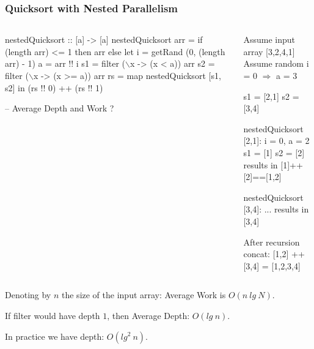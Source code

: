 \documentclass{beamer}
\newcommand{\emp}[1]{\textcolor{DikuRed}{ #1}}
\newcommand{\mymath}[1]{$ #1 $}
\begin{document}
\begin{frame}[fragile,t]
  \frametitle{Quicksort with Nested Parallelism}

\begin{columns}
\begin{colorcode}[fontsize=\scriptsize]
nestedQuicksort :: [a] -> [a]
nestedQuicksort arr = 
  if (length arr) <= 1 then arr else 
  let i = getRand (0, (length arr) - 1)
      a = arr !! i
      s1 = filter (\mymath{\backslash}x -> (x <  a)) arr
      s2 = filter (\mymath{\backslash}x -> (x >= a)) arr
      rs = map nestedQuicksort [s1, s2]
  in  (rs !! 0) ++ (rs !! 1)

-- \alert{Average Depth and Work ?}
\end{colorcode}
\pause
\begin{colorcode}[fontsize=\scriptsize]
Assume input array [3,2,4,1]
Assume random i = 0 \mymath{\Rightarrow} a = 3

s1 = [2,1]
s2 = [3,4]

\emp{nestedQuicksort [2,1]}:
i = 0, a = 2
s1 = [1]
s2 = [2]
results in [1]++[2]==[1,2]

\emp{nestedQuicksort [3,4]}: ...
results in [3,4]

\emp{After recursion concat:}
[1,2] ++ [3,4] = [1,2,3,4]
\end{colorcode}
\end{columns}
\medskip

Denoting by $n$ the size of the input array: Average Work is $O(n \ lg \ N)$.\\
\medskip

If filter would have depth $1$, then Average Depth: $O(lg \ n)$.
\medskip

In practice we have depth: $O(lg^2 \ n)$.

\end{frame}
\end{document}
